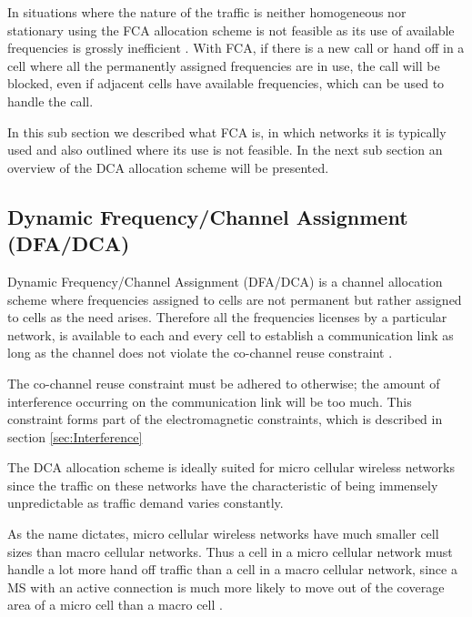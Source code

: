 In situations where the nature of the traffic is neither homogeneous nor stationary using the FCA allocation scheme is not feasible as its use of available frequencies is grossly inefficient \cite{PrinciplesMobileCommunication}. With FCA, if there is a new call or hand off in a cell where all the permanently assigned frequencies are in use, the call will be blocked, even if adjacent cells have available frequencies, which can be used to handle the call\cite{PrinciplesMobileCommunication}.

In this sub section we described what FCA is, in which networks it is typically used and also outlined where its use is not feasible. In the next sub section an overview of the DCA allocation scheme will be presented.
\subsection{Dynamic Frequency/Channel Assignment (DFA/DCA)}
Dynamic Frequency/Channel Assignment (DFA/DCA) is a channel allocation scheme where frequencies assigned to cells are not permanent but rather assigned to cells as the need arises\cite{PrinciplesMobileCommunication}. Therefore all the frequencies licenses by a particular network, is available to each and every cell to establish a communication link as long as the channel does not violate the co-channel reuse constraint \cite{PrinciplesMobileCommunication}. 

The co-channel reuse constraint must be adhered to otherwise; the amount of interference occurring on the communication link will be too much. This constraint forms part of the electromagnetic constraints, which is described in section \ref{sec:Interference}

The DCA allocation scheme is ideally suited for micro cellular wireless networks since the traffic on these networks have the characteristic of being immensely unpredictable as traffic demand varies constantly\cite{PrinciplesMobileCommunication,WirelessCommunications,MobileWirelessCommunicationss}.

As the name dictates, micro cellular wireless networks have much smaller cell sizes than macro cellular networks. Thus a cell in a micro cellular network must handle a lot more hand off traffic than a cell in a macro cellular network, since a MS with an active connection is much more likely to move out of the coverage area of a micro cell than a macro cell \cite{PrinciplesMobileCommunication,WirelessCommunications,MobileWirelessCommunicationss}.

